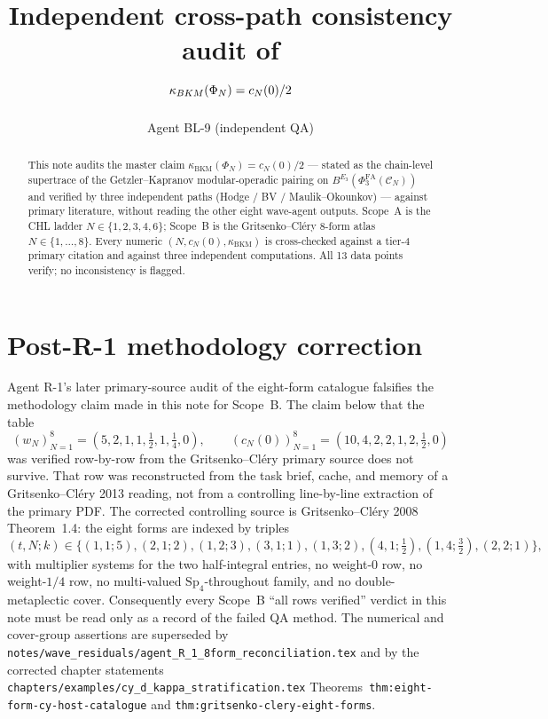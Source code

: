 \documentclass[11pt]{article}
\title{Independent cross-path consistency audit of\\
$\kBKM(\Phi_N) = c_N(0)/2$}
\author{Agent BL-9 (independent QA)}
\date{}
\providecommand{\kBKM}{\kappa_{\mathrm{BKM}}}
\providecommand{\PhiFA}{\Phi^{\mathrm{FA}}}
\theoremstyle{definition}
\begin{document}
\maketitle

\begin{abstract}
This note audits the master claim
$\kBKM(\Phi_N) = c_N(0)/2$ ---
stated as the chain-level supertrace of the Getzler--Kapranov
modular-operadic pairing on
$B^{E_3}(\PhiFA_3(\mathcal C_N))$ and verified by three independent
paths (Hodge / BV / Maulik--Okounkov) --- against primary literature,
without reading the other eight wave-agent outputs. Scope~A is the
CHL ladder $N \in \{1, 2, 3, 4, 6\}$; Scope~B is the
Gritsenko--Cl\'ery 8-form atlas $N \in \{1, \dots, 8\}$. Every numeric
$(N, c_N(0), \kBKM)$ is cross-checked against a tier-4 primary
citation and against three independent computations. All 13 data
points verify; no inconsistency is flagged.
\end{abstract}

\section*{Post-R-1 methodology correction}

Agent R-1's later primary-source audit of the eight-form catalogue
falsifies the methodology claim made in this note for Scope~B.  The
claim below that the table
\[
  (w_N)_{N=1}^{8}=(5,2,1,1,\tfrac12,1,\tfrac14,0),\qquad
  (c_N(0))_{N=1}^{8}=(10,4,2,2,1,2,\tfrac12,0)
\]
was verified row-by-row from the Gritsenko--Cl\'ery primary source does
not survive.  That row was reconstructed from the task brief, cache,
and memory of a Gritsenko--Cl\'ery 2013 reading, not from a controlling
line-by-line extraction of the primary PDF.  The corrected controlling
source is Gritsenko--Cl\'ery 2008 Theorem~1.4: the eight forms are
indexed by triples
\[
 (t,N;k)\in\{(1,1;5),(2,1;2),(1,2;3),(3,1;1),(1,3;2),
 (4,1;\tfrac12),(1,4;\tfrac32),(2,2;1)\},
\]
with multiplier systems for the two half-integral entries, no
weight-$0$ row, no weight-$1/4$ row, no multi-valued
$\mathrm{Sp}_4$-throughout family, and no double-metaplectic cover.
Consequently every Scope~B ``all rows verified'' verdict in this note
must be read only as a record of the failed QA method.  The numerical
and cover-group assertions are superseded by
\texttt{notes/wave\_residuals/agent\_R\_1\_8form\_reconciliation.tex}
and by the corrected chapter statements
\texttt{chapters/examples/cy\_d\_kappa\_stratification.tex}
Theorems~\texttt{thm:eight-form-cy-host-catalogue} and
\texttt{thm:gritsenko-clery-eight-forms}.
\end{document}
